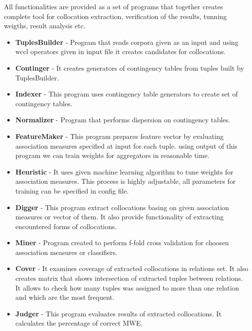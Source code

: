 All functionalities are provided as a set of programs that together creates complete tool for collocation extraction,
verification of the results, tunning weigths, result analysis etc.
\begin{itemize}
    \item \textbf{TuplesBuilder} - Program that reads corpora given as an input and using wccl operators given in input file 
    it creates candidates for collocations.
 
    \item \textbf{Continger} - It creates generators of contingency tables from tuples built by TuplesBuilder.
 
    \item \textbf{Indexer} - This program uses contingency table generators to create set of contingency tables.
 
    \item \textbf{Normalizer} - Program that performs dispersion on contingency tables.
 
    \item \textbf{FeatureMaker} - This program prepares feature vector by evaluating association measures specified at input for each tuple. 
    using output of this program we can train weights for aggregators in reasonable time.
 
    \item \textbf{Heuristic} - It uses given machine learning algorithm to tune weights for association measures. 
    This process is highly adjustable, all parameters for training can be specified in config file.
 
    \item \textbf{Digger} - This program extract collocations basing on given association measures or vector of them. 
    It also provide functionality of extracting encountered forms of collocations.
 
    \item \textbf{Miner} - Program created to perform f-fold cross validation for choosen association measures or classifiers.
    
    \item \textbf{Cover} - It examines coverage of extracted collocations in relations set. It also creates matrix 
    that shows intersection of extracted tuples between relations. It allows to check how many tuples was assigned to more than one relation 
    and which are the most frequent.
 
    \item \textbf{Judger} - This program evaluates results of extracted collocations. It calculates the percentage of correct MWE.
 

\end{itemize}
